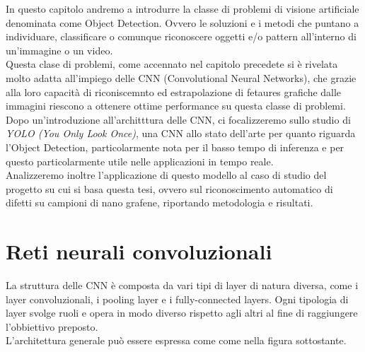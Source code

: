 \documentclass[12pt,a4paper,openright,twoside]{report}
\begin{document}
In questo capitolo andremo a introdurre la classe di problemi di visione artificiale denominata come Object Detection. Ovvero le soluzioni e i metodi che puntano a individuare, classificare o comunque riconoscere oggetti e/o pattern all'interno di un'immagine o un video. \\
Questa clase di problemi, come accennato nel capitolo precedete si è rivelata molto adatta all'impiego delle CNN (Convolutional Neural Networks), che grazie alla loro capacità di riconiscemnto ed estrapolazione di fetaures grafiche dalle immagini riescono a ottenere ottime performance su questa classe di problemi.\\
Dopo un'introduzione all'architttura delle CNN, ci focalizzeremo sullo studio di \emph{YOLO (You Only Look Once)}, una CNN allo stato dell'arte per quanto riguarda l'Object Detection, particolarmente nota per il basso tempo di inferenza e per questo particolarmente utile nelle applicazioni in tempo reale.\\
Analizzeremo inoltre l'applicazione di questo modello al caso di studio del progetto su cui si basa questa tesi, ovvero sul riconoscimento automatico di difetti su campioni di nano grafene, riportando metodologia e risultati.
\section{Reti neurali convoluzionali}
La struttura delle CNN è composta da vari tipi di layer di natura diversa, come i layer convoluzionali, i pooling layer e i fully-connected layers. 
Ogni tipologia di layer svolge ruoli e opera in modo diverso rispetto agli altri al fine di raggiungere l'obbiettivo preposto.
\\L'architettura generale può essere espressa come come nella figura sottostante.\\
\end{document}
